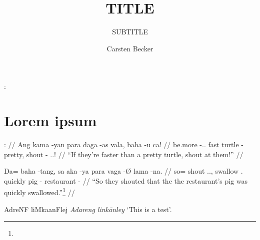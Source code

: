 \documentclass[12pt,paper=a4]{scrartcl}
\author{Carsten Becker}
\title{TITLE}
\subtitle{SUBTITLE}
\newcommand{\xayr}[3]{{\Tagati #1} \emph{#2} \enquote*{#3}}
\newenvironment{mytitle}{
    \hfill
    \begin{minipage}{0.667\textwidth}
	\vspace{\baselineskip}
	\begin{center}
	    \Large
	    \sffamily\bfseries
	    \makeatletter
}{
	    \makeatother
	\end{center}
	\vspace{1em}
    \end{minipage}
    \hfill
}
\begin{document}

\begin{mytitle}
    \@title: \@subtitle
\end{mytitle}

\section{Lorem ipsum}
\lipsum[1]

\ex
\begingl
    \glpreamble \textcite[17]{blah}: //
    \gla Ang     kama    -yan                para daga   -as      vala,   baha  -u      ca! //
    \glb \AgtT{} be.more -\Tpl{}.\M{}.\Top{} fast turtle -\Parg{} pretty, shout -\Imp{} \Tpl{}.\M{}.\Loc{}! //
    \glft \enquote{If they're faster than a pretty turtle, shout at them!} //
\endgl
\xe

\ex
\begingl
    \gla Da= baha  -tang,               sa      aka     -ya         para    vaga -Ø      lama       -na. //
    \glb so= shout \Tpl{}.\M{}.\Aarg{}, \PatT{} swallow \Tsg{}.\M{} quickly pig  -\Top{} restaurant -\Gen{} //
    \glft \enquote{So they shouted that the the restaurant’s pig was quickly swallowed.}\footnote{\lipsum[10]} //
\endgl
\xe

\xayr{AdreNF liMkaanFlej}{Adareng linkānley}{This is a test}.

\lipsum[2-5]


\nocite{*} %
\printbibliography
\end{document}
